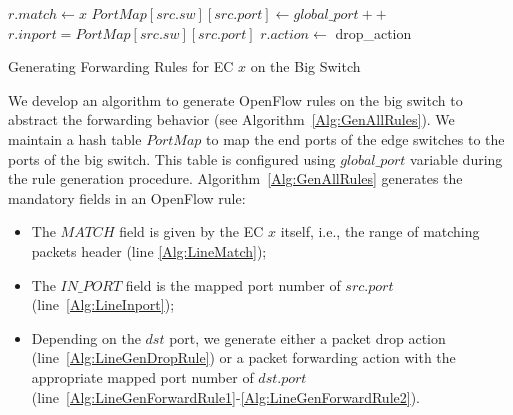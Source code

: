 \begin{algorithm}[htbp]
\DontPrintSemicolon
{}
 {
        $r.match \gets x$\;\label{Alg:LineMatch}
         {
                $PortMap[src.sw][src.port] \gets global\_port++$\;
        }
        $r.inport = PortMap[src.sw][src.port]$\;\label{Alg:LineInport}
         {
                $r.action \gets $ drop\_action\;\label{Alg:LineGenDropRule}
        }
}
\caption{Generating Forwarding Rules for EC $x$ on the Big Switch\label{Alg:GenAllRules}}
\end{algorithm}

We develop an algorithm to generate OpenFlow rules on the big switch to abstract the forwarding behavior (see Algorithm~\ref{Alg:GenAllRules}).
We maintain a hash table $PortMap$ to map the end ports of the edge switches to the ports of the big switch.
This table is configured using $global\_port$ variable during the rule generation procedure. 
Algorithm~\ref{Alg:GenAllRules} generates the mandatory fields in an OpenFlow rule:
\begin{itemize}
\item The $MATCH$ field is given by the EC $x$ itself, i.e., the range of matching packets header (line \ref{Alg:LineMatch});
\item The $IN\_PORT$ field is the mapped port number of $src.port$ (line~\ref{Alg:LineInport});
\item Depending on the $dst$ port, we generate either a packet drop action (line~\ref{Alg:LineGenDropRule}) or a packet forwarding action with the appropriate mapped port number of $dst.port$ (line~\ref{Alg:LineGenForwardRule1}-\ref{Alg:LineGenForwardRule2}).
\end{itemize}


